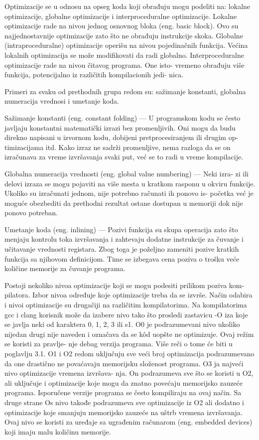 \documentclass[12pt,oneside]{memoir}
\begin{document}
Optimizacije se u odnosu na opseg koda koji obrađuju mogu podeliti na: lokalne optimizacije, globalne optimizacije i interproceduralne optimizacije.
Lokalne optimizacije rade na nivou jednog osnovnog bloka (eng. basic block).
Ovo su najjednostavnije optimizacije zato što ne obrađuju instrukcije skoka.
Globalne (intraproceduralne) optimizacije operišu na nivou pojedinačnih
funkcija. Većina lokalnih optimizacija se može modifikovati da radi globalno.
Interproceduralne optimizacije rade na nivou čitavog programa. One isto-
vremeno obrađuju više funkcija, potencijalno iz različitih kompilacionih jedi-
nica.

Primeri za svaku od prethodnih grupa redom su: sažimanje konstanti, globalna numeracija vrednosi i umetanje koda.

Sažimanje konstanti (eng. constant folding) — U programskom kodu se često
javljaju konstantni matematički izrazi bez promenljivih. Oni mogu da budu
direkno napisani u izvornom kodu, dobijeni pretprocesiranjem ili drugim op-
timizacijama itd. Kako izraz ne sadrži promenljive, nema razloga da se on
izračunava za vreme izvršavanja svaki put, već se to radi u vreme kompilacije.

Globalna numeracija vrednosti (eng. global value numbering) — Neki izra-
zi ili delovi izraza se mogu pojaviti na više mesta u kratkom rasponu u okviru
funkcije. Ukoliko su izračunati jednom, nije potrebno računati ih ponovo is-
početka već je moguće obezbediti da prethodni rezultat ostane dostupan u
memoriji dok nije ponovo potreban.

Umetanje koda (eng. inlining) — Pozivi funkcija su skupa operacija zato što
menjaju kontrolu toka izvršavanja i zahtevaju dodatne instrukcije za čuvanje
i učitavanje vrednosti registara. Zbog toga je poželjno zameniti pozive kratkih
funkcija sa njihovom definicijom. Time se izbegava cena poziva o trošku veće
količine memorije za čuvanje programa.

Postoji nekoliko nivoa optimizacije koji se mogu podesiti prilikom poziva kom-
pilatora. Izbor nivoa određuje koje optimizacije treba da se izvrše. Način odabira i
nivoi optimizacije su drugačiji na različitim kompilatorima. Na kompilatorima gcc i
clang korisnik može da izabere nivo tako što prosledi zastavicu -O iza koje se javlja
neki od karaktera 0, 1, 2, 3 ili s1. O0 je podrazumevani nivo ukoliko nijedan drugi nije
naveden i označava da se kôd uopšte ne optimizuje. Ovaj režim se koristi za pravlje-
nje debag verzija programa. Više reči o tome će biti u poglavlju 3.1. O1 i O2 redom
uključuju sve veći broj optimizacija podrazumevano da one drastično ne povaćavaju
memorijsku složenost programa. O3 ja najveći nivo optimizacije vremena izvršava-
nja. On podrazumeva sve što se koristi u O2, ali uključuje i optimizacije koje mogu
da znatno povećaju memorijsko zauzeće programa. Isporučene verzije programa se
često kompiliraju na ovaj način. Sa druge strane Os nivo takođe podrazumeva sve
optimizacije iz O2 ali dodatno i optimizacije koje smanjuju memorijsko zauzeće na
uštrb vremena izvršavanja. Ovaj nivo se koristi za uređaje sa ugrađenim računarom
(eng. embedded devices) koji imaju malu količinu memorije.
\end{document}

